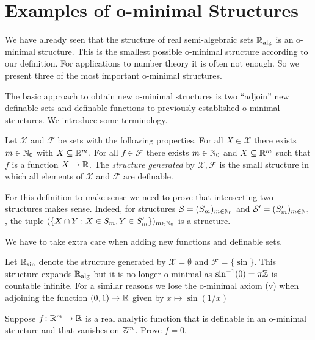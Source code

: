 \section{Examples of o-minimal Structures}

We have already seen that the structure of real semi-algebraic sets
${\mathbb{R}}_{\mathrm{alg}}$ is an o-minimal structure. This is the smallest possible
o-minimal structure according to our definition. For applications to
number theory it is often not enough. So we present three of the most
important o-minimal structures.


The basic approach to obtain  new o-minimal structures is two
``adjoin'' new definable sets and definable functions to previously
established o-minimal structures.
We introduce some terminology.

\begin{definition}
  Let $\mathscr{X}$ and $\mathscr{F}$ be sets with the following
  properties. For all $X\in \mathscr{X}$ there exists $m\in{\mathbb{N}}_0$ with
  $X\subseteq{\mathbb{R}}^m$. For all $f\in \mathscr{F}$ there exists $m\in{\mathbb{N}}_0$
  and $X\subseteq{\mathbb{R}}^m$ such that $f$ is a function $X\rightarrow{\mathbb{R}}$. The
  \emph{structure generated} by $\mathscr{X},\mathscr{F}$ is the small
  structure in which all elements of $\mathscr{X}$ and $\mathscr{F}$ are
  definable.
\end{definition}

For this definition to make sense we need to prove that intersecting
two structures makes sense. Indeed, for 
structures ${\mathcal S}=(S_m)_{m\in{\mathbb{N}}_0}$ and ${\mathcal S}'=(S'_m)_{m\in{\mathbb{N}}_0}$, the tuple
$(\{X\cap Y : X\in S_m, Y\in S'_m\})_{m\in{\mathbb{N}}_0}$ is a structure.

We have to take extra care when adding new functions and definable
sets. 

\begin{example}
  \label{ex:adjoinsin}
  Let ${\mathbb{R}}_{\sin}$ denote the structure generated by
  $\mathscr{X}=\emptyset$ and $\mathscr{F}=\{\sin \}$.
  This structure expands ${\mathbb{R}}_{\mathrm{alg}}$ but it is no longer o-minimal as
  $\sin^{-1}(0)=\pi{\mathbb{Z}}$ is countable infinite.
  For a similar reasons we lose the o-minimal axiom (v) when adjoining the function
  $(0,1)\rightarrow{\mathbb{R}}$ given by $x\mapsto \sin (1/x)$ 
\end{example}


\begin{exercise}
  \label{exer:periodic}
  Suppose $f\colon {\mathbb{R}}^m\rightarrow{\mathbb{R}}$ is a real analytic function
  that is definable in an o-minimal structure and
  that vanishes on ${\mathbb{Z}}^m$. Prove $f=0$.  
\end{exercise}

